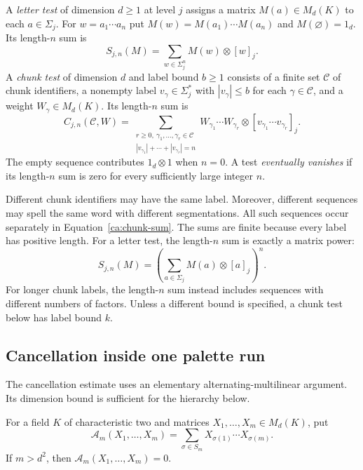 \begin{definition}
\label{ca:tests}
A \emph{letter test} of dimension $d\geq1$ at level $j$ assigns a matrix
$M(a)\in M_d(K)$ to each $a\in\Sigma_j$.  For
$w=a_1\cdots a_n$ put $M(w)=M(a_1)\cdots M(a_n)$ and $M(\varnothing)=1_d$.
Its length-$n$ sum is
\begin{equation}
  S_{j,n}(M)=\sum_{w\in\Sigma_j^n} M(w)\otimes[w]_j.
  \label{ca:letter-sum}
\end{equation}
A \emph{chunk test} of dimension $d$ and label bound $b\geq1$ consists of
a finite set $\mathcal C$ of chunk identifiers, a nonempty label
$v_\gamma\in\Sigma_j^*$ with $|v_\gamma|\leq b$ for each
$\gamma\in\mathcal C$, and a weight $W_\gamma\in M_d(K)$.  Its length-$n$
sum is
\begin{equation}
  C_{j,n}(\mathcal C,W)=
  \sum_{\substack{r\geq0,\ \gamma_1,\ldots,\gamma_r\in\mathcal C\\
                   |v_{\gamma_1}|+\cdots+|v_{\gamma_r}|=n}}
  W_{\gamma_1}\cdots W_{\gamma_r}
       \otimes[v_{\gamma_1}\cdots v_{\gamma_r}]_j.
  \label{ca:chunk-sum}
\end{equation}
The empty sequence contributes $1_d\otimes1$ when $n=0$.
A test \emph{eventually vanishes} if its length-$n$ sum is zero for every
sufficiently large integer $n$.
\end{definition}

Different chunk identifiers may have the same label.  Moreover, different
sequences may spell the same word with different segmentations.  All such
sequences occur separately in Equation~\eqref{ca:chunk-sum}.  The sums are
finite because every label has positive length. For a letter test,
the length-$n$ sum is exactly a matrix power:
\[
 S_{j,n}(M)=\left(\sum_{a\in\Sigma_j}M(a)\otimes[a]_j\right)^n.
\]
For longer chunk labels, the length-$n$ sum instead includes sequences
with different numbers of factors. Unless a different bound is specified,
a chunk test below has label bound $k$.

\subsection{Cancellation inside one palette run}

The cancellation estimate uses an elementary alternating-multilinear
argument. Its dimension bound is sufficient for the hierarchy below.

\begin{lemma}
\label{ca:alternating}
For a field $K$ of characteristic two and matrices
$X_1,\ldots,X_m\in M_d(K)$, put
\[
  \mathcal A_m(X_1,\ldots,X_m)
   =\sum_{\sigma\in S_m}X_{\sigma(1)}\cdots X_{\sigma(m)}.
\]
If $m>d^2$, then $\mathcal A_m(X_1,\ldots,X_m)=0$.
\end{lemma}

